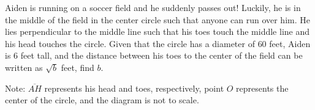 Aiden is running on a soccer field and he suddenly passes out! Luckily, he is in the middle of the field in the center circle such that anyone can run over him. He lies perpendicular to the middle line such that his toes touch the middle line and his head touches the circle. Given that the circle has a diameter of $60$ feet, Aiden is $6$ feet tall, and the distance between his toes to the center of the field can be written as $\sqrt{b}$ feet, find $b$.



Note: $\overline{AH}$ represents his head and toes, respectively, point $O$ represents the center of the circle, and the diagram is not to scale.
